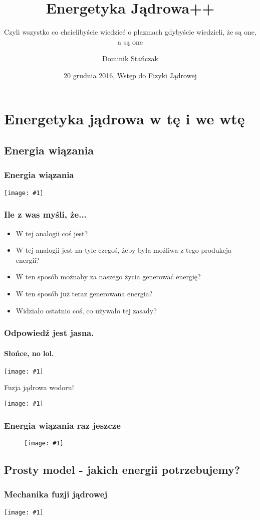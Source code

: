\documentclass{beamer}
\title[Fizyka plazmy]{Energetyka Jądrowa++}
\subtitle{Czyli wszystko co chcielibyście wiedzieć o plazmach gdybyście
wiedzieli, że są one, a są one}
\institute{Politechnika Warszawska}
\author{Dominik Stańczak}
\date{20 grudnia 2016, Wstęp do Fizyki Jądrowej}
\newcommand {\framedgraphic}[1] {
        \begin{center}
            \texttt{[image: \#1]}
        \end{center}
}
\begin{document}
  \frame{\titlepage}

  \section{Energetyka jądrowa w tę i we wtę}
  \subsection{Energia wiązania}

  \begin{frame}
    \frametitle{Energia wiązania}
    \framedgraphic{img/binding_energy.png}
  \end{frame}


  \begin{frame}
    \frametitle{Ile z was myśli, że...}
    \begin{itemize}[<+->]
      \item W tej analogii coś jest?
      \item W tej analogii jest na tyle czegoś, żeby była możliwa z tego produkcja energii?
      \item W ten sposób możnaby za naszego życia generować energię?
      \item W ten sposób już teraz generowana energia?
      \item Widziało ostatnio coś, co używało tej zasady?
    \end{itemize}
   \end{frame}


  \begin{frame}
    \frametitle{Odpowiedź jest jasna.}
    \framesubtitle{Słońce, no lol.}
    \framedgraphic{img/large_sun}
  \end{frame}
  \begin{frame}[t]{Fuzja jądrowa wodoru!}
    \framedgraphic{img/hh_fusion}
  \end{frame}


  \begin{frame}
    \frametitle{Energia wiązania raz jeszcze}
    \begin{figure}
      \framedgraphic{img/binding_energy_star}
    \end{figure}
  \end{frame}

  \subsection{Prosty model - jakich energii potrzebujemy?}
  \begin{frame}
    \frametitle{Mechanika fuzji jądrowej}
    \framedgraphic{img/energia1.png}
  \end{frame}
\end{document}
